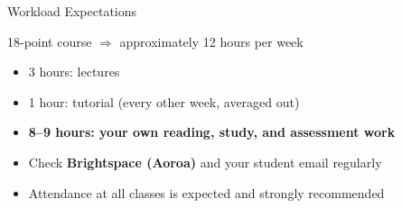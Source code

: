 \documentclass[aspectratio=169, 12pt]{beamer}
\begin{document}
\begin{frame}{Workload Expectations}
  \begin{block}{18-point course $\Rightarrow$ approximately 12 hours per week}
    \begin{itemize}
      \item 3 hours: lectures
      \item 1 hour: tutorial (every other week, averaged out)
      \item \textbf{8--9 hours: your own reading, study, and assessment work}
      \item Check \textbf{Brightspace (Aoroa)} and your student email regularly
      \item Attendance at all classes is expected and strongly recommended
    \end{itemize}
  \end{block}
\end{frame}


\end{document}
